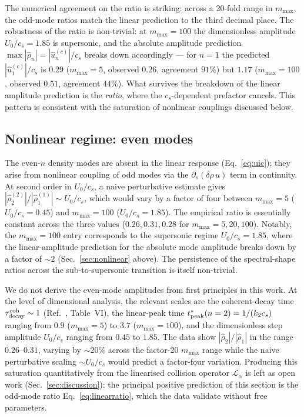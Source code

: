 \documentclass[aps,pre,twocolumn,superscriptaddress,longbibliography,floatfix]{revtex4-2}
\begin{document}
The numerical agreement on the ratio is striking: across a
20-fold range in $m_{\max}$, the odd-mode ratios match the
linear prediction to the third decimal place. The robustness
of the ratio is non-trivial: at $m_{\max}=100$ the dimensionless
amplitude $U_0/c_s = 1.85$ is supersonic, and the absolute
amplitude prediction $\max|\hat\rho_n| = |\hat u^{(c)}_n|/c_s$
breaks down accordingly --- for $n=1$ the predicted
$|\hat u^{(c)}_1|/c_s$ is $0.29$ ($m_{\max}=5$, observed $0.26$,
agreement $91\%$) but $1.17$ ($m_{\max}=100$, observed $0.51$,
agreement $44\%$). What survives the breakdown of the linear
amplitude prediction is the \emph{ratio}, where the
$c_s$-dependent prefactor cancels. This pattern is consistent
with the saturation of nonlinear couplings discussed below.

\subsection{Nonlinear regime: even modes}

The even-$n$ density modes are absent in the linear response
(Eq.~\ref{eq:uic}); they arise from nonlinear coupling of
odd modes via the $\partial_s(\delta\rho\,u)$ term in
continuity. At second order in $U_0/c_s$, a naive perturbative
estimate gives $|\hat\rho_2^{(2)}|/|\hat\rho_1^{(1)}| \sim
U_0/c_s$, which would vary by a factor of four between
$m_{\max}=5$ ($U_0/c_s=0.45$) and $m_{\max}=100$
($U_0/c_s=1.85$). The empirical ratio is essentially constant
across the three values
($0.26, 0.31, 0.28$ for $m_{\max}=5,20,100$).
Notably, the $m_{\max}=100$ entry corresponds to the supersonic
regime $U_0/c_s=1.85$, where the linear-amplitude prediction
for the absolute mode amplitude breaks down by a factor of
$\sim 2$ (Sec.~\ref{sec:nonlinear} above). The persistence of
the spectral-shape ratios across the sub-to-supersonic
transition is itself non-trivial.

We do not derive the even-mode amplitudes from first principles
in this work. At the level of dimensional analysis, the
relevant scales are the coherent-decay time
$\tau_{\rm decay}^{\rm coh}\sim 1$
(Ref.~\cite{PaperIII}, Table~VI),
the linear-peak time $t^*_{\rm peak}(n=2) = 1/(k_2 c_s)$
ranging from $0.9$ ($m_{\max}=5$) to $3.7$ ($m_{\max}=100$),
and the dimensionless step amplitude $U_0/c_s$ ranging from
$0.45$ to $1.85$. The data show $|\hat\rho_2|/|\hat\rho_1|$ in
the range $0.26$--$0.31$, varying by $\sim 20\%$ across the
factor-20 $m_{\max}$ range while the naive perturbative scaling
$\sim U_0/c_s$ would predict a factor-four variation. Producing
this saturation quantitatively from the linearised collision
operator $\mathcal{L}_\alpha$ is left as open work
(Sec.~\ref{sec:discussion}); the principal positive prediction
of this section is the odd-mode ratio
Eq.~\eqref{eq:linearratio}, which the data validate
without free parameters.
\end{document}
